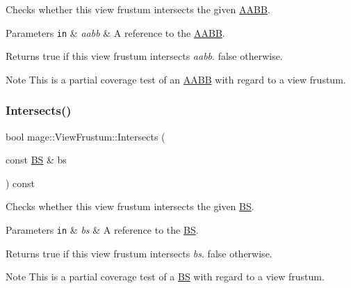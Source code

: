 Checks whether this view frustum intersects the given \hyperlink{structmage_1_1_a_a_b_b}{A\+A\+BB}.


\begin{DoxyParams}[1]{Parameters}
\mbox{\tt in}  & {\em aabb} & A reference to the \hyperlink{structmage_1_1_a_a_b_b}{A\+A\+BB}. \\
\hline
\end{DoxyParams}
\begin{DoxyReturn}{Returns}
{\ttfamily true} if this view frustum intersects {\itshape aabb}. {\ttfamily false} otherwise. 
\end{DoxyReturn}
\begin{DoxyNote}{Note}
This is a partial coverage test of an \hyperlink{structmage_1_1_a_a_b_b}{A\+A\+BB} with regard to a view frustum. 
\end{DoxyNote}
\hypertarget{structmage_1_1_view_frustum_a2925f619827d284c86ea5a68e694a8a8}{}\label{structmage_1_1_view_frustum_a2925f619827d284c86ea5a68e694a8a8} 
\subsubsection{\texorpdfstring{Intersects()}{Intersects()}\hspace{0.1cm}{\footnotesize\ttfamily [4/4]}}
{\footnotesize\ttfamily bool mage\+::\+View\+Frustum\+::\+Intersects (\begin{DoxyParamCaption}\item[{const \hyperlink{structmage_1_1_b_s}{BS} \&}]{bs }\end{DoxyParamCaption}) const\hspace{0.3cm}{\ttfamily [noexcept]}}

Checks whether this view frustum intersects the given \hyperlink{structmage_1_1_b_s}{BS}.


\begin{DoxyParams}[1]{Parameters}
\mbox{\tt in}  & {\em bs} & A reference to the \hyperlink{structmage_1_1_b_s}{BS}. \\
\hline
\end{DoxyParams}
\begin{DoxyReturn}{Returns}
{\ttfamily true} if this view frustum intersects {\itshape bs}. {\ttfamily false} otherwise. 
\end{DoxyReturn}
\begin{DoxyNote}{Note}
This is a partial coverage test of a \hyperlink{structmage_1_1_b_s}{BS} with regard to a view frustum. 
\end{DoxyNote}
\hypertarget{structmage_1_1_view_frustum_a602d2a95ae31c253bf2017b957e47f4c}{}\label{structmage_1_1_view_frustum_a602d2a95ae31c253bf2017b957e47f4c} 
